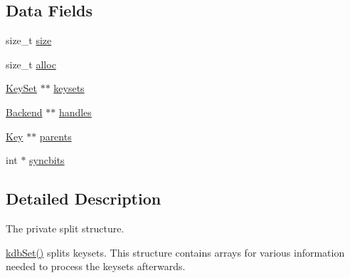\subsection*{Data Fields}
\begin{DoxyCompactItemize}
\item 
size\_\-t \hyperlink{struct__Split_a9c80f6a2c7069e4aca5a47df97e59547}{size}
\item 
size\_\-t \hyperlink{struct__Split_af084c1dd24de7ac71077e4c3f444599b}{alloc}
\item 
\hyperlink{struct__KeySet}{KeySet} $\ast$$\ast$ \hyperlink{struct__Split_a1e13e127dcd9d7ad26539dc092b6ca42}{keysets}
\item 
\hyperlink{struct__Backend}{Backend} $\ast$$\ast$ \hyperlink{struct__Split_accd11de3cd32ffa2bbaf46d3790fc677}{handles}
\item 
\hyperlink{struct__Key}{Key} $\ast$$\ast$ \hyperlink{struct__Split_a8a069875729343a5e3b2a65b313462fe}{parents}
\item 
int $\ast$ \hyperlink{struct__Split_a228c2be31180b880019d6b131919d2e7}{syncbits}
\end{DoxyCompactItemize}


\subsection{Detailed Description}
The private split structure.

\hyperlink{group__kdb_ga11436b058408f83d303ca5e996832bcf}{kdbSet()} splits keysets. This structure contains arrays for various information needed to process the keysets afterwards. 

